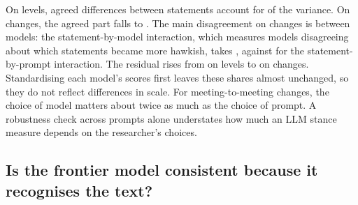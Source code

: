\begin{table}[t]
\centering
\caption{Variance decomposition: statement $\times$ prompt $\times$ model, 2015--2019 block}\label{tab:variance}
\small

\end{table}

On levels, agreed differences between statements account for  of the variance.
On changes, the agreed part falls to . The main disagreement on changes is between
models: the statement-by-model interaction, which measures models disagreeing about which statements
became more hawkish, takes , against  for the
statement-by-prompt interaction. The residual rises from  on levels to
 on changes. Standardising each model's scores first leaves these shares almost
unchanged, so they do not reflect differences in scale. For meeting-to-meeting changes, the choice of
model matters about twice as much as the choice of prompt. A robustness check across prompts alone
understates how much an LLM stance measure depends on the researcher's choices.

\subsection{Is the frontier model consistent because it recognises the text?}

